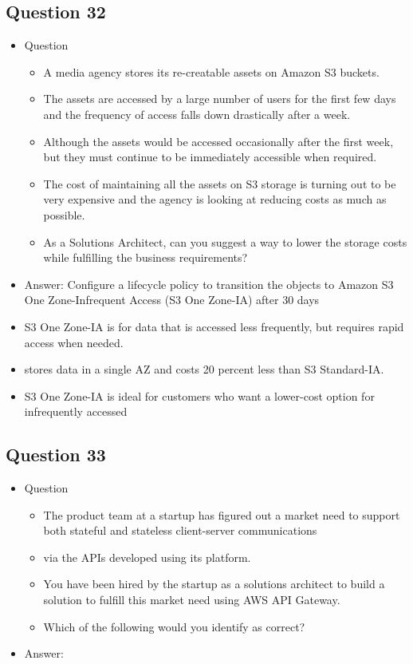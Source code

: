 \documentclass[]{scrartcl}
\begin{document}
\subsection{Question 32}
\begin{itemize}
	\item Question
	\begin{itemize}
		\item A media agency stores its re-creatable assets on Amazon S3 buckets. 
		\item The assets are accessed by a large number of users for the first few days and the frequency of access falls down drastically after a week. 
		\item Although the assets would be accessed occasionally after the first week, but they must continue to be immediately accessible when required. 
		\item The cost of maintaining all the assets on S3 storage is turning out to be very expensive and the agency is looking at reducing costs as much as possible.
		\item As a Solutions Architect, can you suggest a way to lower the storage costs while fulfilling the business requirements?
	\end{itemize}
	\item Answer: Configure a lifecycle policy to transition the objects to Amazon S3 One Zone-Infrequent Access (S3 One Zone-IA) after 30 days
	\item S3 One Zone-IA is for data that is accessed less frequently, but requires rapid access when needed. 
	\item stores data in a single AZ and costs 20 percent less than S3 Standard-IA. 
	\item S3 One Zone-IA is ideal for customers who want a lower-cost option for infrequently accessed
\end{itemize}

\subsection{Question 33}
\begin{itemize}
	\item Question
	\begin{itemize}
		\item The product team at a startup has figured out a market need to support both stateful and stateless client-server communications 
		\item via the APIs developed using its platform. 
		\item You have been hired by the startup as a solutions architect to build a solution to fulfill this market need using AWS API Gateway.
		\item Which of the following would you identify as correct?
	\end{itemize}
	\item Answer: 
\end{itemize}
\end{document}
